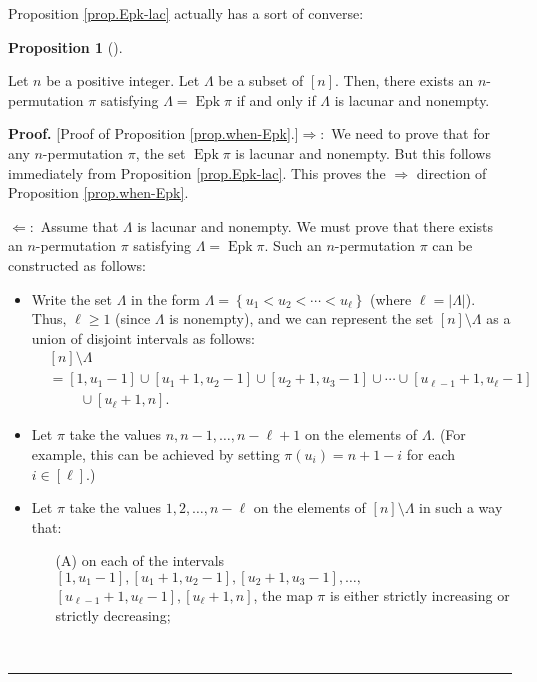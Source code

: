 \documentclass[numbers=enddot,12pt,final,onecolumn,notitlepage]{scrartcl}%
\theoremstyle{definition}
\newtheorem{prop}[theo]{Proposition}
\newenvironment{proposition}[1][]
{\begin{prop}[#1]\begin{leftbar}}
{\end{leftbar}\end{prop}}
\newenvironment{proof}[1][Proof]{\noindent\textbf{#1.} }{\ \rule{0.5em}{0.5em}}
\begin{document}
Proposition \ref{prop.Epk-lac} actually has a sort of converse:

\begin{proposition}
\label{prop.when-Epk}Let $n$ be a positive integer. Let $\Lambda$ be a subset
of $\left[  n\right]  $. Then, there exists an $n$-permutation $\pi$
satisfying $\Lambda=\operatorname*{Epk}\pi$ if and only if $\Lambda$ is
lacunar and nonempty.
\end{proposition}

\begin{proof}
[Proof of Proposition \ref{prop.when-Epk}.]$\Longrightarrow:$ We need to prove
that for any $n$-permutation $\pi$, the set $\operatorname*{Epk}\pi$ is
lacunar and nonempty. But this follows immediately from Proposition
\ref{prop.Epk-lac}. This proves the $\Longrightarrow$ direction of Proposition
\ref{prop.when-Epk}.

$\Longleftarrow:$ Assume that $\Lambda$ is lacunar and nonempty. We must prove
that there exists an $n$-permutation $\pi$ satisfying $\Lambda
=\operatorname*{Epk}\pi$. Such an $n$-permutation $\pi$ can be constructed as follows:

\begin{itemize}
\item Write the set $\Lambda$ in the form $\Lambda=\left\{  u_{1}<u_{2}%
<\cdots<u_{\ell}\right\}  $ (where $\ell=\left\vert \Lambda\right\vert $).
Thus, $\ell\geq1$ (since $\Lambda$ is nonempty), and we can represent the set
$\left[  n\right]  \setminus\Lambda$ as a union of disjoint intervals as
follows:
\begin{align*}
&  \left[  n\right]  \setminus\Lambda\\
&  =\left[  1,u_{1}-1\right]  \cup\left[  u_{1}+1,u_{2}-1\right]  \cup\left[
u_{2}+1,u_{3}-1\right]  \cup\cdots\cup\left[  u_{\ell-1}+1,u_{\ell}-1\right]
\\
&  \ \ \ \ \ \ \ \ \ \ \cup\left[  u_{\ell}+1,n\right]  .
\end{align*}


\item Let $\pi$ take the values $n,n-1,\ldots,n-\ell+1$ on the elements of
$\Lambda$. (For example, this can be achieved by setting $\pi\left(
u_{i}\right)  =n+1-i$ for each $i\in\left[  \ell\right]  $.)

\item Let $\pi$ take the values $1,2,\ldots,n-\ell$ on the elements of
$\left[  n\right]  \setminus\Lambda$ in such a way that:

\begin{itemize}
\item[(A)] on each of the intervals $\left[  1,u_{1}-1\right]  ,\left[
u_{1}+1,u_{2}-1\right]  ,\left[  u_{2}+1,u_{3}-1\right]  ,\ldots,$%
\newline$\left[  u_{\ell-1}+1,u_{\ell}-1\right]  ,\left[  u_{\ell}+1,n\right]
$, the map $\pi$ is either strictly increasing or strictly decreasing;


\end{itemize}
\end{itemize}
\end{proof}
\end{document}
